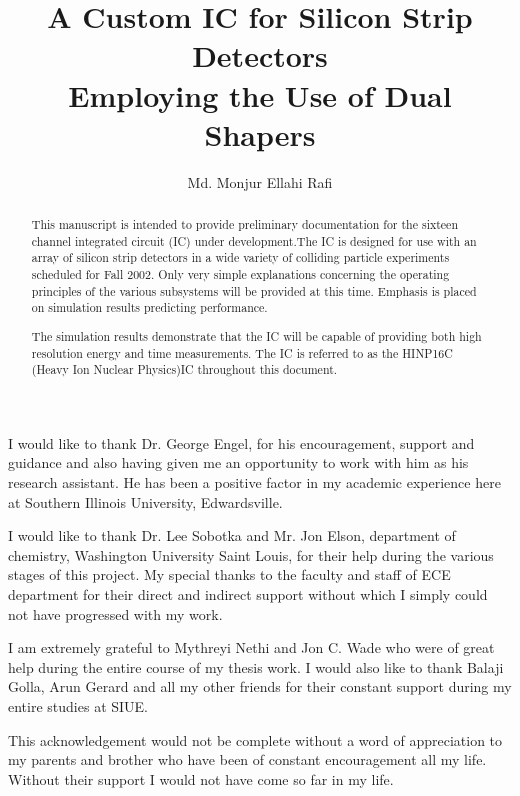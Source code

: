\documentclass[12pt,oneside,final]{siuethesis}
\author{Md. Monjur Ellahi Rafi}
\title{A Custom IC for Silicon Strip Detectors \protect\\
Employing the Use of Dual Shapers}
\theoremstyle{definition}
\begin{document}
\maketitle 

\frontmatter %

\copyrightpage %

\begin{abstract}

This manuscript is intended to provide preliminary documentation for the sixteen channel integrated circuit (IC) under development.The  IC  is 
designed  for  use  with  an  array  of  silicon  strip  detectors  in  a  wide variety of colliding particle experiments scheduled for Fall 2002.  Only very  simple  explanations  concerning  the  operating  principles  of  the various subsystems will be provided at this time.  Emphasis is placed on simulation results predicting performance.

The  simulation  results  demonstrate  that  the  IC  will  be  capable  of providing both high resolution energy and time measurements. The IC is referred to as the HINP16C (Heavy Ion Nuclear Physics)IC throughout this 
document.  


\end{abstract}

\begin{acknowledgements}

I would like to thank Dr. George Engel, for his encouragement, support and guidance 
and also having given  me an opportunity to work with him as  his research assistant. He has 
been  a  positive  factor  in  my  academic  experience  here  at  Southern  Illinois  University, 
Edwardsville.  

I  would  like  to thank  Dr.  Lee  Sobotka  and  Mr.  Jon  Elson,  department  of  chemistry, 
Washington  University  Saint  Louis,  for  their  help  during  the  various  stages  of  this  project. 
My  special  thanks  to  the  faculty  and  staff  of  ECE  department  for  their  direct  and  indirect 
support without which I simply could not have progressed with my work. 

I am extremely grateful to Mythreyi Nethi  and Jon C.  Wade who were of great help 
during  the  entire  course  of  my  thesis  work.  I  would  also  like  to  thank  Balaji  Golla,  Arun 
Gerard and all my other friends for their constant support during my entire studies at SIUE. 

This acknowledgement would not be complete without a word of appreciation to my 
parents  and  brother  who  have  been  of  constant  encouragement  all  my  life.  Without  their 
support I would not have come so far in my life. 


\end{acknowledgements}
\end{document}

